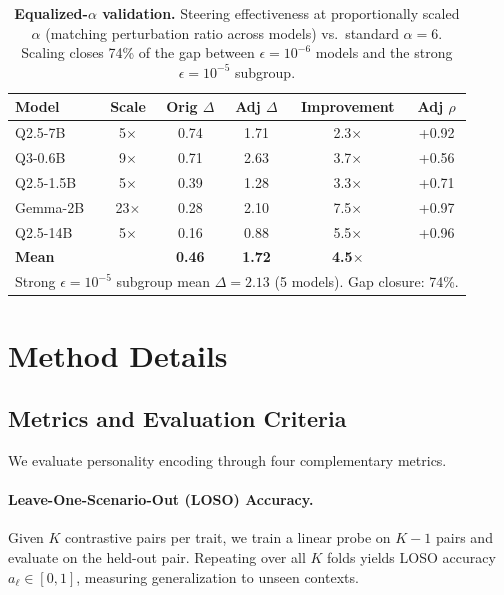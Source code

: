 \documentclass{article}
\begin{document}
\begin{table}[h]
\caption{\textbf{Equalized-$\alpha$ validation.} Steering effectiveness at proportionally scaled $\alpha$ (matching perturbation ratio across models) vs.\ standard $\alpha{=}6$. Scaling closes 74\% of the gap between $\epsilon{=}10^{-6}$ models and the strong $\epsilon{=}10^{-5}$ subgroup.}
\label{tab:equalized_alpha}
\centering
\small
\begin{tabular}{lccccc}
\toprule
\textbf{Model} & \textbf{Scale} & \textbf{Orig $\Delta$} & \textbf{Adj $\Delta$} & \textbf{Improvement} & \textbf{Adj $\rho$} \\
\midrule
Q2.5-7B & 5$\times$ & 0.74 & 1.71 & 2.3$\times$ & +0.92 \\
Q3-0.6B & 9$\times$ & 0.71 & 2.63 & 3.7$\times$ & +0.56 \\
Q2.5-1.5B & 5$\times$ & 0.39 & 1.28 & 3.3$\times$ & +0.71 \\
Gemma-2B & 23$\times$ & 0.28 & 2.10 & 7.5$\times$ & +0.97 \\
Q2.5-14B & 5$\times$ & 0.16 & 0.88 & 5.5$\times$ & +0.96 \\
\midrule
\textbf{Mean} & & \textbf{0.46} & \textbf{1.72} & \textbf{4.5$\times$} & \\
\bottomrule
\multicolumn{6}{l}{\footnotesize Strong $\epsilon{=}10^{-5}$ subgroup mean $\Delta{=}2.13$ (5 models). Gap closure: 74\%.}
\end{tabular}
\end{table}

\section{Method Details}\label{app:method_details}

\subsection{Metrics and Evaluation Criteria}

We evaluate personality encoding through four complementary metrics.

\paragraph{Leave-One-Scenario-Out (LOSO) Accuracy.}
Given $K$ contrastive pairs per trait, we train a linear probe on $K{-}1$ pairs and evaluate on the held-out pair. Repeating over all $K$ folds yields LOSO accuracy $a_\ell \in [0,1]$, measuring generalization to unseen contexts.
\end{document}
